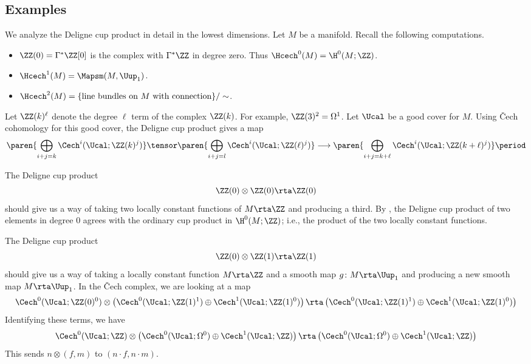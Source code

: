 
\subsection{Examples}\label{subsec:Delignecupexamples}

We analyze the Deligne cup product in detail in the lowest dimensions. Let $M$ be a manifold. Recall the following computations.
\begin{itemize}
	\item $\ZZ(0)=\Gamma^*\ZZ[0]$ is the complex with $\Gamma^*\ZZ$ in degree zero. 
	Thus $\Hcech^0(M)=\H^0(M;\ZZ)$.

	\item $\Hcech^1(M)=\Mapsm(M,\Uup_{1})$.

	\item $\Hcech^2(M)=\{\text{line bundles on $M$ with connection}\}/\sim$.
\end{itemize}
Let $\ZZ(k)^\ell$ denote the degree $\ell$ term of the complex $\ZZ(k)$. 
For example, $\ZZ(3)^2=\Omega^1$. 
Let $\Ucal$ be a good cover for $M$. 
Using Čech cohomology for this good cover, the Deligne cup product gives a map
\begin{equation*}
	\paren{\bigoplus_{i+j=k}\Cech^i(\Ucal;\ZZ(k)^j)} \tensor \paren{\bigoplus_{i+j=l}\Cech^i(\Ucal;\ZZ(\ell)^j)} \longrightarrow \paren{\bigoplus_{i+j=k+\ell}\Cech^i(\Ucal;\ZZ(k+\ell)^j)} \period
\end{equation*}

\begin{example}
	The Deligne cup product
	\[
		\ZZ(0)\otimes\ZZ(0)\rta\ZZ(0)
	\]
	should give us a way of taking two locally constant functions of $M\rta\ZZ$ and producing a third.
	By , the Deligne cup product of two elements in degree 0 agrees with the ordinary cup product in $\H^0(M;\ZZ)$; i.e., the product of the two locally constant functions.
\end{example}

\begin{example}
	The Deligne cup product
	\[
		\ZZ(0)\otimes\ZZ(1)\rta\ZZ(1)
	\]
	should give us a way of taking a locally constant function $M\rta\ZZ$ and a smooth map $g\colon M\rta \Uup_{1}$ and producing a new smooth map $M\rta \Uup_{1}$.  
	In the Čech complex, we are looking at a map
	\[
		\Cech^0(\Ucal;\ZZ(0)^0)\otimes \left(\Cech^0(\Ucal;\ZZ(1)^1)\oplus \Cech^1(\Ucal;\ZZ(1)^0)\right)\rta \left(\Cech^0(\Ucal;\ZZ(1)^1)\oplus \Cech^1(\Ucal;\ZZ(1)^0)\right)
	\]
	Identifying these terms, we have
	\[
		\Cech^0(\Ucal;\ZZ)\otimes \left(\Cech^0(\Ucal;\Omega^0)\oplus \Cech^1(\Ucal;\ZZ)\right)\rta \left(\Cech^0(\Ucal;\Omega^0)\oplus \Cech^1(\Ucal;\ZZ)\right)
	\]
	This sends $n\otimes(f,m)$ to $(n\cdot f,n\cdot m)$.
\end{example}

